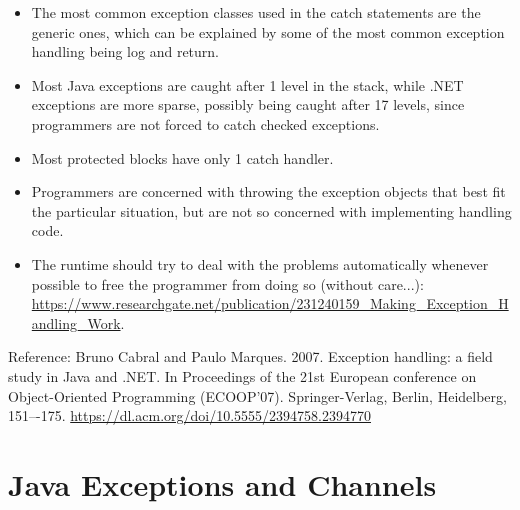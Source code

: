 \documentclass[a4paper,11pt]{article}
\theoremstyle{plain}
\theoremstyle{nonumberplain}
\begin{document}
\begin{itemize}
  \item The most common exception classes used in the catch statements are the generic ones, which can be explained by some of the most common exception handling being log and return.
  \item Most Java exceptions are caught after 1 level in the stack, while .NET exceptions are more sparse, possibly being caught after 17 levels, since programmers are not forced to catch checked exceptions.
  \item Most protected blocks have only 1 catch handler.
  \item Programmers are concerned with throwing the exception objects that best fit the particular situation, but are not so concerned with implementing handling code.
  \item The runtime should try to deal with the problems automatically whenever possible to free the programmer from doing so (without care...): \href{https://www.researchgate.net/publication/231240159\_Making\_Exception\_Handling\_Work}{https://www.researchgate.net/publication/231240159\_Making\_Exception\_Handling\_Work}.
\end{itemize}

Reference: Bruno Cabral and Paulo Marques. 2007. Exception handling: a field study in Java and .NET. In Proceedings of the 21st European conference on Object-Oriented Programming (ECOOP'07). Springer-Verlag, Berlin, Heidelberg, 151–-175. \href{https://dl.acm.org/doi/10.5555/2394758.2394770}{https://dl.acm.org/doi/10.5555/2394758.2394770}

\section{Java Exceptions and Channels}
\end{document}
